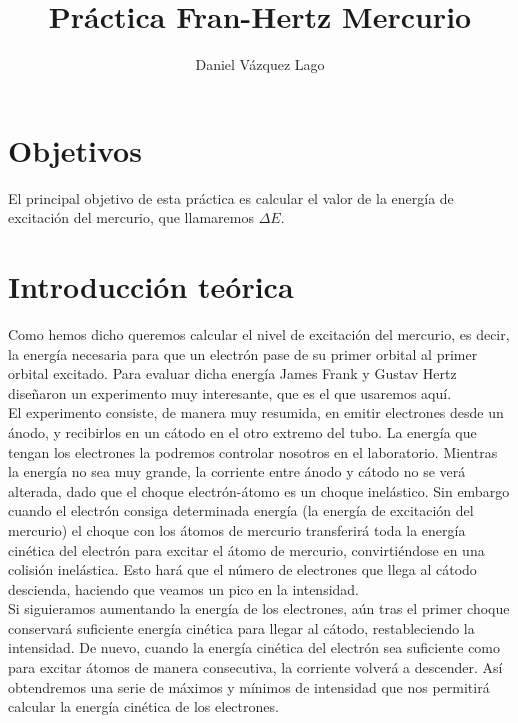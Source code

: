 \documentclass[12pt,a4paper]{article}
\title{Práctica Fran-Hertz Mercurio}
\author{Daniel Vázquez Lago}
\numberwithin{equation}{section}
\numberwithin{figure}{section}
\begin{document}
\maketitle

\newpage

\tableofcontents

\newpage

\section{Objetivos}

El principal objetivo de esta práctica es calcular el valor de la energía de excitación del mercurio, que llamaremos $\Delta E$.

\section{Introducción teórica}

Como hemos dicho queremos calcular el nivel de excitación del mercurio, es decir, la energía necesaria para que un electrón pase de su primer orbital al primer orbital excitado. Para evaluar dicha energía James Frank y Gustav Hertz diseñaron un experimento muy interesante, que es el que usaremos aquí. \\

El experimento consiste, de manera muy resumida, en emitir electrones desde un ánodo, y recibirlos en un cátodo en el otro extremo del tubo. La energía que tengan los electrones la podremos controlar nosotros en el laboratorio. Mientras la energía no sea muy grande, la corriente entre ánodo y cátodo no se verá alterada, dado que el choque electrón-átomo es un choque inelástico. Sin embargo cuando el electrón consiga determinada energía (la energía de excitación del mercurio) el choque con los átomos de mercurio transferirá toda la energía cinética del electrón para excitar el átomo de mercurio, convirtiéndose en una colisión inelástica. Esto hará que el número de electrones que llega al cátodo descienda, haciendo que veamos un pico en la intensidad. \\

Si siguieramos aumentando la energía de los electrones, aún tras el primer choque conservará suficiente energía cinética para llegar al cátodo, restableciendo la intensidad. De nuevo, cuando la energía cinética del electrón sea suficiente como para excitar átomos de manera consecutiva, la corriente volverá a descender. Así obtendremos una serie de máximos y mínimos de intensidad que nos permitirá calcular la energía cinética de los electrones. \\
\end{document}

